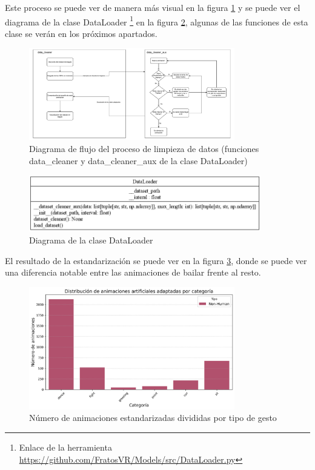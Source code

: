 Este proceso se puede ver de manera más visual en la figura \ref{fig:data_cleaner} y se puede ver el diagrama de la clase DataLoader \footnote{Enlace de la herramienta \url{https://github.com/FratosVR/Models/src/DataLoader.py}} en la figura \ref{fig:data_loader}, algunas de las funciones de esta clase se verán en los próximos apartados.

\begin{figure}[H]
    \centering
    \includegraphics[width=0.8\textwidth]{Imagenes/Vectorial/data_cleaner.pdf}
    \caption{Diagrama de flujo del proceso de limpieza de datos (funciones data\_cleaner y data\_cleaner\_aux de la clase DataLoader)}
    \label{fig:data_cleaner}
\end{figure}

\begin{figure}[H]
    \centering
    \includegraphics[width=0.9\textwidth]{Imagenes/Bitmap/DataLoader_UML.png}
    \caption{Diagrama de la clase DataLoader}
    \label{fig:data_loader}
\end{figure}

El resultado de la estandarización se puede ver en la figura \ref{fig:AnimacionesEstandar}, donde se puede ver una diferencia notable entre las animaciones de bailar frente al resto.

\begin{figure}[H]
    \centering
    \includegraphics[width=0.8\textwidth]{Imagenes/Bitmap/AnimacionesEstandarizadas.jpeg}
    \caption{Número de animaciones estandarizadas divididas por tipo de gesto}
    \label{fig:AnimacionesEstandar}
\end{figure}
